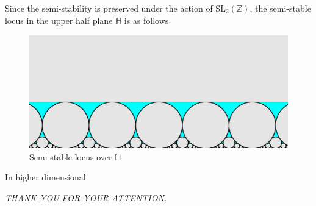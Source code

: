 \documentclass[pdf]{beamer}
\begin{document}
\begin{frame}
    Since the semi-stability is preserved under the action of $\text{SL}_2(\mathbb{Z})$, the semi-stable locus in the
    upper half plane $\mathbb{H}$ is as follows

\end{frame}
\begin{frame}
    \begin{figure}[h]
        \includegraphics[width = \textwidth]{ss-locus.png}
        \caption{Semi-stable locus over $\mathbb{H}$}
    \end{figure}
\end{frame}

\begin{frame}{In higher dimensional}


\end{frame}
\begin{frame}
    \begin{center}
        \textit{THANK YOU FOR YOUR ATTENTION.}
    \end{center}
\end{frame}
\end{document}
